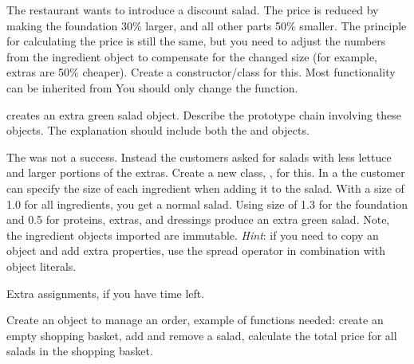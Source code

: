 \documentclass[fleqn, article, a4paper]{memoir}
\begin{document}
\begin{Assignments}
\item The restaurant wants to introduce a discount salad. The price is reduced by making the foundation 30\% larger, and all other parts 50\% smaller. The principle for calculating the price is still the same, but you need to adjust the numbers from the ingredient object to compensate for the changed size (for example, extras are 50\% cheaper). Create a  constructor/class for this. Most functionality can be inherited from  You should only change the  function.

\item {} creates an extra green salad object. Describe the prototype chain involving these objects. The explanation should include both the  and  objects.

\item The  was not a success. Instead the customers asked for salads with less lettuce and larger portions of the extras. Create a new class, , for this. In a  the customer can specify the size of each ingredient when adding it to the salad. With a size of 1.0 for all ingredients, you get a normal salad. Using size of 1.3 for the foundation and 0.5 for proteins, extras, and dressings produce an extra green salad. Note, the ingredient objects imported are immutable. \emph{Hint}: if you need to copy an object and add extra properties, use the spread operator in combination with object literals.

\end{Assignments}

\noindent Extra assignments, if you have time left.
\begin{Assignments}

\item Create an object to manage an order, example of functions needed: create an empty shopping basket, add and remove a salad, calculate the total price for all salads in the shopping basket.

\end{Assignments}


\end{document}
